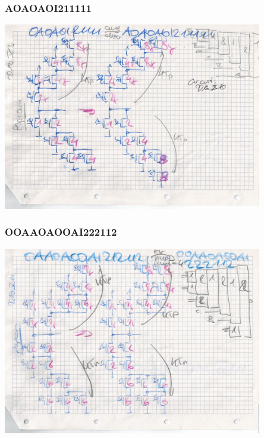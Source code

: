 \documentclass[aspectratio=169]{beamer}
\begin{document}

\begin{frame}
\frametitle{AOAOAOI211111}
    \begin{center}
        \includegraphics[width=0.85\textwidth]{AOAOAOI211111.jpg}
    \end{center}
\end{frame}


\begin{frame}
\frametitle{OOAAOAOOAI222112}
    \begin{center}
        \includegraphics[width=0.85\textwidth]{OOAAOAOOAI222112.jpg}
    \end{center}
\end{frame}

\end{document}

